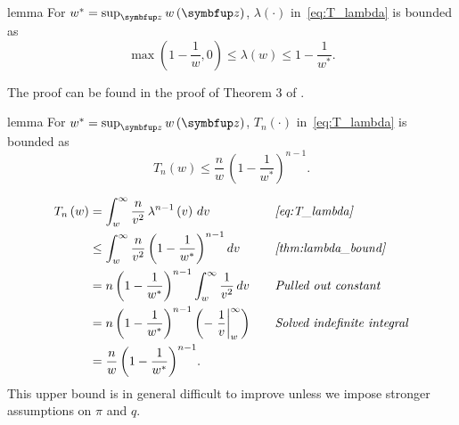 
\begin{theoremEnd}{lemma}\label{thm:lambda_bound}
  For \(w^* = \sup_{\vz} w\left(\vz\right) \), \(\lambda\left(\cdot\right)\) in~\cref{eq:T_lambda} is bounded as
  \[
   \max\left(1 - \frac{1}{w}, 0\right) \leq \lambda\left(w\right) \leq 1 - \frac{1}{w^*}.
  \]
\end{theoremEnd}
\begin{proofEnd}
  The proof can be found in the proof of Theorem 3 of \citet{Smith96exacttransition}.
\end{proofEnd}

\begin{theoremEnd}{lemma}\label{thm:tn_bound}
  For \(w^* = \sup_{\vz} w\left(\vz\right) \), \(T_n\left(\cdot\right)\) in~\cref{eq:T_lambda} is bounded as
  \[
  T_n\left( w \right) \leq \frac{n}{w} \, {\left(1 - \frac{1}{w^*}\right)}^{n-1}.
  \]
\end{theoremEnd}
\begin{proofEnd}
  \begin{alignat*}{2}
    T_n\left(w\right) 
    &= \int_w^{\infty} \frac{n}{v^2} \, \lambda^{n-1}\left(v\right)\,dv
    &&\quad\text{\textit{\cref{eq:T_lambda}}}
    \\
    &\leq \int_w^{\infty} \frac{n}{v^2} \, {\left(1 - \frac{1}{w^*}\right)}^{n-1}\,dv
    &&\quad\text{\textit{\cref{thm:lambda_bound}}}
    \\
    &= n \, {\left(1 - \frac{1}{w^*}\right)}^{n-1}  \int_w^{\infty} \frac{1}{v^2} \,dv
    &&\quad\text{\textit{Pulled out constant}}
    \\
    &= n \, {\left(1 - \frac{1}{w^*}\right)}^{n-1}  \left( {-\left.\frac{1}{v}\right\rvert^{\infty}_{w}} \right)
    &&\quad\text{\textit{Solved indefinite integral}}
    \\
    &= \frac{n}{w} \, {\left(1 - \frac{1}{w^*}\right)}^{n-1}.
  \end{alignat*}
  This upper bound is in general difficult to improve unless we impose stronger assumptions on \(\pi\) and \(q\).
\end{proofEnd}

